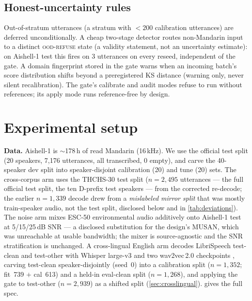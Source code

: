 \documentclass[11pt]{article}
\begin{document}
\subsection{Honest-uncertainty rules}\label{sec:honest}

Out-of-stratum utterances (a stratum with $<200$ calibration utterances) are deferred
unconditionally. A cheap two-stage detector routes non-Mandarin input to a distinct
\textsc{ood-refuse} state (a validity statement, not an uncertainty estimate): on
Aishell-1 test this fires on 3 utterances on every reseed, independent of the gate.
A domain fingerprint stored in the gate warns when an incoming batch's score
distribution shifts beyond a preregistered KS distance (warning only, never silent
recalibration). The gate's calibrate and audit modes refuse to run without references;
its apply mode runs reference-free by design.

\section{Experimental setup}\label{sec:setup}

\textbf{Data.} Aishell-1 \citep{bu2017aishell} is $\sim$178\,h of read Mandarin
(16\,kHz). We use the official test split (20 speakers, 7{,}176 utterances, all
transcribed, 0 empty), and carve the 40-speaker dev split into speaker-disjoint
calibration (20) and tune (20) sets. The cross-corpus arm uses the THCHS-30 test
split \citep{wang2015thchs30} ($n=2{,}495$ utterances --- the full official test split,
the ten D-prefix test speakers --- from the corrected re-decode; the earlier $n=1{,}339$
decode drew from a \emph{mislabeled mirror split} that was mostly train-speaker audio, not
the test split, disclosed below and in \cref{tab:deviations}). The noise arm
mixes ESC-50 environmental audio \citep{piczak2015esc50} additively onto Aishell-1
test at 5/15/25\,dB SNR --- a disclosed substitution for the design's MUSAN, which was
unreachable at usable bandwidth; the mixer is source-agnostic and the SNR
stratification is unchanged. A cross-lingual English arm decodes LibriSpeech
\citep{panayotov2015librispeech} test-clean and test-other with Whisper large-v3 and
two wav2vec\,2.0 checkpoints \citep{baevski2020wav2vec2}, carving test-clean speaker-disjointly (seed~0)
into a calibration split ($n=1{,}352$; fit~739 $+$ cal~613) and a held-in eval-clean split
($n=1{,}268$), and applying the gate to test-other ($n=2{,}939$) as a shifted split
(\cref{sec:crosslingual}).  gives the full spec.
\end{document}
